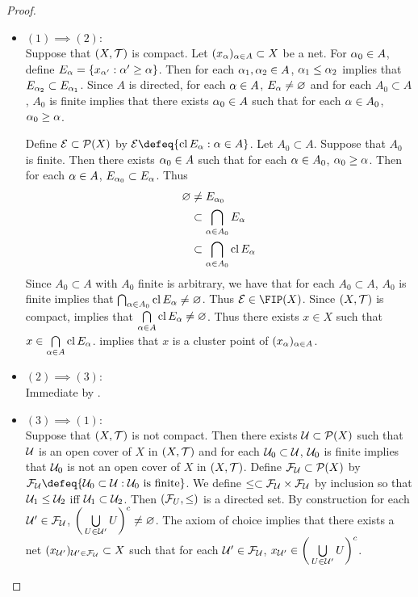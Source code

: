 \documentclass{book}
\begin{document}
	\begin{proof}\
		\begin{itemize}
			\item $(1) \implies (2)$: \\
			Suppose that $(X, \mathcal{T})$ is compact. Let $(x_{\alpha})_{\alpha \in A} \subset X$ be a net. For $\alpha_0 \in A$, define $E_{\alpha} = \{x_{\alpha'} : \alpha' \geq \alpha\}$. Then for each $\alpha_1, \alpha_2 \in A$, $\alpha_1 \leq \alpha_2$ implies that $E_{\alpha_2} \subset E_{\alpha_1}$. Since $A$ is directed, for each $\alpha \in A$, $E_{\alpha} \neq \varnothing$ and for each $A_0 \subset A$, $A_0$ is finite implies that there exists $\alpha_0 \in A$ such that for each $\alpha \in A_0$, $\alpha_0 \geq \alpha$. 
			
			Define $\mathcal{E} \subset \mathcal{P}(X)$ by $\ME \defeq \{\cl E_{\al}: \al \in A\}$. Let $A_0 \subset A$. Suppose that $A_0$ is finite. Then there exists $\alpha_0 \in A$ such that for each $\alpha \in A_0$, $\alpha_0 \geq \alpha$. Then for each $\alpha \in A$, $E_{\alpha_0} \subset E_{\alpha}$. Thus 
			\begin{align*}
				\varnothing 
				& \neq E_{\alpha_0} \\
				& \subset \bigcap_{\alpha \in A_0} E_{\alpha} \\
				& \subset \bigcap_{\alpha \in A_0} \operatorname{cl} E_{\alpha}
			\end{align*}
			Since $A_0 \subset A$ with $A_0$ finite is arbitrary, we have that for each $A_0 \subset A$, $A_0$ is finite implies that $\bigcap_{\alpha \in A_0} \operatorname{cl} E_{\alpha} \neq \varnothing$. Thus $\ME \in \FIP(X)$. Since $(X, \mathcal{T})$ is compact,  implies that $\bigcap\limits_{\alpha \in A} \operatorname{cl} E_{\alpha} \neq \varnothing$. Thus there exists $x \in X$ such that $x \in \bigcap\limits_{\alpha \in A} \operatorname{cl} E_{\alpha}$.  implies that $x$ is a cluster point of $(x_{\alpha})_{\alpha \in A}$.
			\item $(2) \implies (3)$: \\
			Immediate by .
			\item $(3) \implies (1)$: \\
			Suppose that $(X, \mathcal{T})$ is not compact. Then there exists $\mathcal{U} \subset \mathcal{P}(X)$ such that $\mathcal{U}$ is an open cover of $X$ in $(X, \mathcal{T})$ and for each $\mathcal{U}_0 \subset \mathcal{U}$, $\mathcal{U}_0$ is finite implies that $\mathcal{U}_0$ is not an open cover of $X$ in $(X, \mathcal{T})$. Define $\mathcal{F}_{\mathcal{U}} \subset \mathcal{P}(X)$ by $\MF_{\MU} \defeq \{\MU_0 \subset \MU: \MU_0 \text{ is finite}\}$. We define $\leq \subset \mathcal{F}_{\mathcal{U}} \times \mathcal{F}_{\mathcal{U}}$ by inclusion so that $\mathcal{U}_1 \leq \mathcal{U}_2$ iff $\mathcal{U}_1 \subset \mathcal{U}_2$. Then $(\mathcal{F}_U, \leq)$ is a directed set. By construction for each $\mathcal{U}' \in \mathcal{F}_{\mathcal{U}}$, $\bigg( \bigcup\limits_{U \in \mathcal{U}'} U \bigg)^c \neq \varnothing$. The axiom of choice implies that there exists a net $(x_{\mathcal{U}'})_{\mathcal{U}' \in \mathcal{F}_{\mathcal{U}}} \subset X$ such that for each $\mathcal{U}' \in \mathcal{F}_{\mathcal{U}}$, $x_{\mathcal{U}'} \in \bigg( \bigcup\limits_{U \in \mathcal{U}'} U \bigg)^c$. 
			

\end{itemize}
\end{proof}
\end{document}

